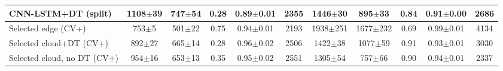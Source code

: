 \begin{table}[t]
\begin{tabular}{l|ccccc|ccccc}
CNN-LSTM+DT (split) & 1108$\pm$39 & 747$\pm$54 & 0.28 & 0.89$\pm$0.01 & 2355 & 1446$\pm$30 & 895$\pm$33 & 0.84 & 0.91$\pm$0.00 & 2686 \\
\midrule
Selected edge (CV+) & 753$\pm$5 & 501$\pm$22 & 0.75 & 0.94$\pm$0.01 & 2193 & 1938$\pm$251 & 1677$\pm$232 & 0.69 & 0.99$\pm$0.01 & 4134 \\
Selected cloud+DT (CV+) & 892$\pm$27 & 665$\pm$14 & 0.28 & 0.96$\pm$0.02 & 2506 & 1422$\pm$38 & 1077$\pm$59 & 0.91 & 0.93$\pm$0.01 & 3030 \\
Selected cloud, no DT (CV+) & 954$\pm$16 & 653$\pm$13 & 0.35 & 0.95$\pm$0.02 & 2551 & 1305$\pm$54 & 757$\pm$66 & 0.90 & 0.94$\pm$0.01 & 2337 \\
\bottomrule
\end{tabular}
\end{table}
